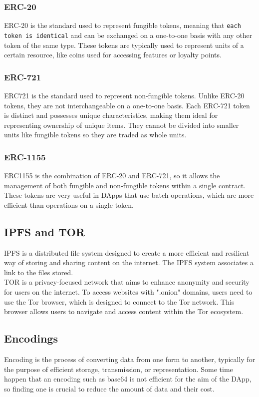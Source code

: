 \documentclass[main.tex]{subfiles}
\begin{document}
    \subsubsection{ERC-20}
    ERC-20\cite{ft} is the standard used to represent fungible tokens, meaning that \texttt{each token is identical} and can be exchanged on a one-to-one basis with any other token of the same type.
    These tokens are typically used to represent units of a certain resource, like coins used for accessing features or loyalty points.
    \subsubsection{ERC-721}
    ERC721 is the standard used to represent non-fungible tokens\cite{nft}. Unlike ERC-20 tokens, they are not interchangeable on a one-to-one basis. Each ERC-721 token is distinct and possesses unique characteristics, making them ideal for representing ownership of unique items. 
    They cannot be divided into smaller units like fungible tokens so they are traded as whole units.
    \subsubsection{ERC-1155}
    ERC1155\cite{ERC-1155} is the combination of ERC-20 and ERC-721, so it allows the management of both fungible and non-fungible tokens within a single contract. These tokens are very useful in DApps that use batch operations, which are more efficient than operations on a single token.

\subsection{IPFS and TOR}
IPFS is a distributed file system designed to create a more efficient and resilient way of storing and sharing content on the internet.\cite{IPFS_Benet_paper_2014} The IPFS system associates a link to the files stored.\\
TOR is a privacy-focused network that aims to enhance anonymity and security for users on the internet.
To access websites with ".onion" domains, users need to use the Tor browser, which is designed to connect to the Tor network. This browser allows users to navigate and access content within the Tor ecosystem. \cite{Tor_v2}

\subsection{Encodings}
Encoding is the process of converting data from one form to another, typically for the purpose of efficient storage, transmission, or representation. Some time happen that an encoding such as base64 is not efficient for the aim of the DApp, so finding one is crucial to reduce the amount of data and their cost.
\end{document}
